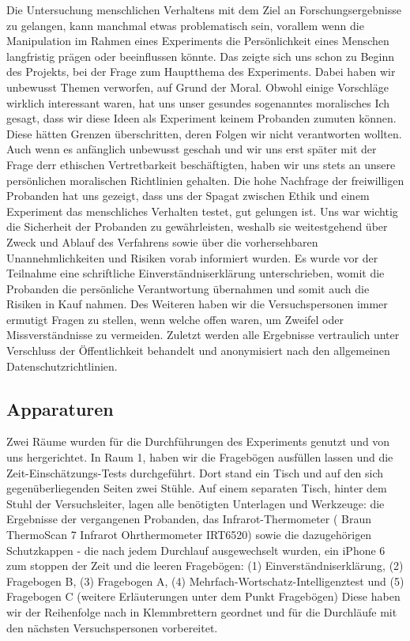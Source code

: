 \documentclass{Bericht}
\begin{document}
Die Untersuchung menschlichen Verhaltens mit dem Ziel an Forschungsergebnisse zu gelangen, kann manchmal etwas problematisch sein, vorallem wenn die Manipulation im Rahmen eines Experiments die Persönlichkeit eines Menschen langfristig prägen oder beeinflussen könnte. Das zeigte sich uns schon zu Beginn des Projekts, bei der Frage zum Hauptthema des Experiments. Dabei haben wir unbewusst Themen verworfen, auf Grund der Moral. Obwohl einige Vorschläge wirklich interessant waren, hat uns unser gesundes sogenanntes moralisches Ich gesagt, dass wir diese Ideen als Experiment keinem Probanden zumuten können. Diese hätten Grenzen überschritten, deren Folgen wir nicht verantworten wollten. Auch wenn es anfänglich unbewusst geschah und wir uns erst später mit der Frage derr ethischen Vertretbarkeit beschäftigten, haben wir uns stets an unsere persönlichen moralischen Richtlinien gehalten. Die hohe Nachfrage der freiwilligen Probanden hat uns gezeigt, dass uns der Spagat zwischen Ethik und einem Experiment  das menschliches Verhalten testet, gut gelungen ist. Uns war wichtig die Sicherheit der Probanden zu gewährleisten, weshalb sie weitestgehend über Zweck und Ablauf des Verfahrens sowie über die vorhersehbaren Unannehmlichkeiten und Risiken vorab informiert wurden. Es wurde vor der Teilnahme eine schriftliche Einverständniserklärung unterschrieben, womit die Probanden die persönliche Verantwortung übernahmen und somit auch die Risiken in Kauf nahmen. Des Weiteren haben wir die Versuchspersonen immer ermutigt Fragen zu stellen, wenn welche offen waren, um Zweifel oder Missverständnisse zu vermeiden. Zuletzt werden alle Ergebnisse vertraulich unter Verschluss der {\"O}ffentlichkeit behandelt und anonymisiert nach den allgemeinen Datenschutzrichtlinien.

\subsection {Apparaturen}

Zwei Räume wurden für die Durchführungen des Experiments genutzt und von uns hergerichtet. In Raum 1, haben wir die Fragebögen ausfüllen lassen und die Zeit-Einschätzungs-Tests durchgeführt. Dort stand ein Tisch und auf den sich gegenüberliegenden Seiten zwei Stühle. Auf einem separaten Tisch, hinter dem Stuhl der Versuchsleiter, lagen alle benötigten Unterlagen und Werkzeuge: die Ergebnisse der vergangenen Probanden, das Infrarot-Thermometer ( Braun ThermoScan 7 Infrarot Ohrthermometer IRT6520) sowie die dazugehörigen Schutzkappen - die nach jedem Durchlauf ausgewechselt wurden, ein iPhone 6 zum stoppen der Zeit und die leeren Fragebögen: (1) Einverständniserklärung, (2)  \glqq Fragebogen B\grqq{}, (3)  \glqq Fragebogen A\grqq{}, (4) Mehrfach-Wortschatz-Intelligenztest und (5)  \glqq Fragebogen C\grqq{} (weitere Erläuterungen unter dem Punkt  \glqq  Fragebögen\grqq{}) Diese haben wir der Reihenfolge nach in Klemmbrettern geordnet und für die Durchläufe mit den nächsten Versuchspersonen vorbereitet. 
\end{document}
